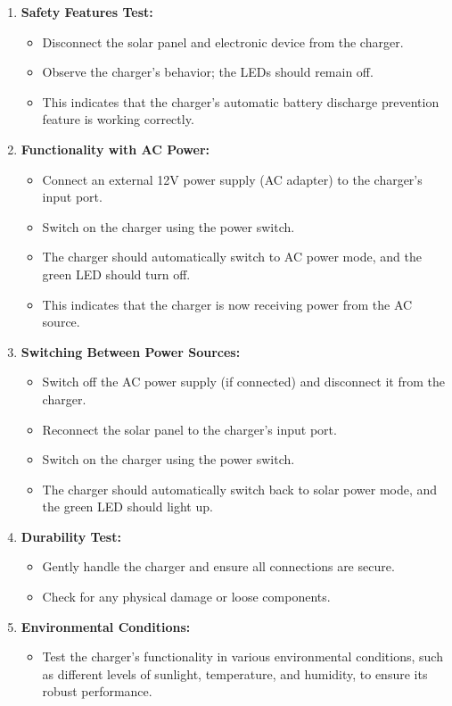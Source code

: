\documentclass[twocolumn]{article}
\begin{document}
\begin{enumerate}
  \item \textbf{Safety Features Test:}
    \begin{itemize}
      \item Disconnect the solar panel and electronic device from the charger.
      \item Observe the charger's behavior; the LEDs should remain off.
      \item This indicates that the charger's automatic battery discharge prevention feature is working correctly.
    \end{itemize}

  \item \textbf{Functionality with AC Power:}
    \begin{itemize}
      \item Connect an external 12V power supply (AC adapter) to the charger's input port.
      \item Switch on the charger using the power switch.
      \item The charger should automatically switch to AC power mode, and the green LED should turn off.
      \item This indicates that the charger is now receiving power from the AC source.
    \end{itemize}

  \item \textbf{Switching Between Power Sources:}
    \begin{itemize}
      \item Switch off the AC power supply (if connected) and disconnect it from the charger.
      \item Reconnect the solar panel to the charger's input port.
      \item Switch on the charger using the power switch.
      \item The charger should automatically switch back to solar power mode, and the green LED should light up.
    \end{itemize}

  \item \textbf{Durability Test:}
    \begin{itemize}
      \item Gently handle the charger and ensure all connections are secure.
      \item Check for any physical damage or loose components.
    \end{itemize}

  \item \textbf{Environmental Conditions:}
    \begin{itemize}
      \item Test the charger's functionality in various environmental conditions, such as different levels of sunlight, temperature, and humidity, to ensure its robust performance.
    \end{itemize}

\end{enumerate}
\end{document}

